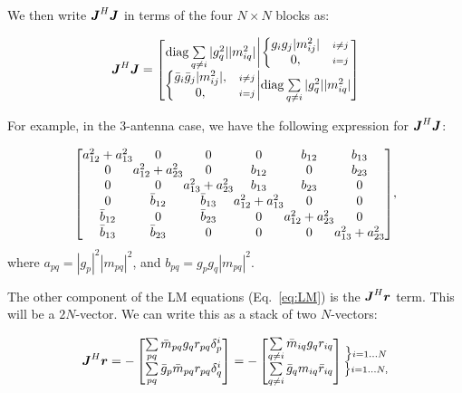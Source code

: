 \documentclass[useAMS,usenatbib]{mn2e}
\newcommand{\mat}[1]{{\bmath{#1}}}
\newcommand{\JJ}{\mat{J}} %
\begin{document}
We then write $\JJ^H\JJ$ in terms of the four $N\times N$ blocks as:

\begin{equation}
\label{eq:JHJ:DI}
\JJ^H \JJ = \Matrix{c@{\bigg |}c}{
\mathrm{diag} \sum\limits_{q\ne i} |g^2_{q}| |m^2_{iq}| & 
  \left \{ 
  \begin{array}{@{}cc@{}}
   g_{i} g_{j} |m^2_{ij}|&{\scriptstyle i\ne j} \\
   0, &{\scriptstyle i=j}
  \end{array} \right .\\
  \left \{ 
  \begin{array}{@{}cc@{}}
   \bar{g}_{i} \bar{g}_{j} |m^2_{ij}|,&{\scriptstyle i\ne j} \\
   0, &{\scriptstyle i=j}
  \end{array} \right . 
  & \mathrm{diag} \sum\limits_{q\ne i} |g^2_{q}| |m^2_{iq}| 
}
\end{equation}

For example, in the 3-antenna case, we have the following expression for
$\JJ^H \JJ$:

\newcommand{\yysq}[2]{{a^2_{#1}+a^2_{#2}}}
\newcommand{\bb}[1]{{b_{#1}}}
\newcommand{\bbb}[1]{{\bar{b}_{#1}}}
\[
{\scriptstyle
\Matrix{c@{}c@{}c@{}c@{}c@{}c}{
\yysq{12}{13} & 0             & 0             & 0             & \bb{12}       & \bb{13} \\
0             & \yysq{12}{23} & 0             & \bb{12}       & 0             & \bb{23} \\
0             & 0             & \yysq{13}{23} & \bb{13}       & \bb{23}       & 0       \\
0             & \bbb{12}      & \bbb{13}      & \yysq{12}{13} & 0             & 0       \\ 
\bbb{12}      & 0             & \bbb{23}      & 0             & \yysq{12}{23} & 0 \\
\bbb{13}      & \bbb{23}      & 0             & 0             & 0             &  \yysq{13}{23}  
}
},
\]
where $a_{pq}=|g_p|^2|m_{pq}|^2$, and $b_{pq}=g_p g_q |m_{pq}|^2$.

The other component of the LM equations (Eq.~\ref{eq:LM}) is the $\JJ^H\bmath{r}$ term. This will be a
$2N$-vector. We can write this as a stack of two $N$-vectors:


\begin{equation}
\label{eq:JHR:DI}
\JJ^H\bmath{r} = -\Matrix{c}{ 
\sum\limits_{pq} \bar{m}_{pq}g_q r_{pq} \delta^{i}_p  \\
\sum\limits_{pq} \bar{g}_p \bar{m}_{pq} r_{pq} \delta^{i}_q 
} = -\Matrix{c}{
\sum\limits_{q\ne i} \bar{m}_{iq}g_q r_{iq}   \\
\sum\limits_{q\ne i} \bar{g}_q m_{iq} \bar{r}_{iq}  
}
\Stack{ 
\big \} \scriptstyle i=1\dots N \\ 
\big \} \scriptstyle i=1\dots N,
}
\end{equation}
\end{document}
